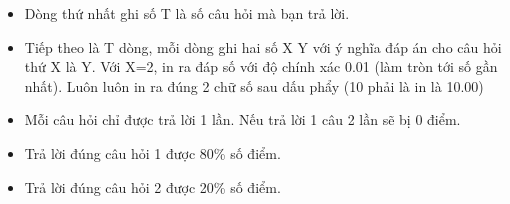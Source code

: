 \begin{itemize}
	\item Dòng thứ nhất ghi số T là số câu hỏi mà bạn trả lời.
	\item Tiếp theo là T dòng, mỗi dòng ghi hai số X Y với ý nghĩa đáp án cho câu hỏi thứ X là Y. Với X=2, in ra đáp số với độ chính xác 0.01 (làm tròn tới số gần nhất). Luôn luôn in ra đúng 2 chữ số sau dấu phẩy (10 phải là in là 10.00)
	\item Mỗi câu hỏi chỉ được trả lời 1 lần. Nếu trả lời 1 câu 2 lần sẽ bị 0 điểm.
	\item Trả lời đúng câu hỏi 1 được 80\% số điểm.
	\item Trả lời đúng câu hỏi 2 được 20\% số điểm.
\end{itemize}